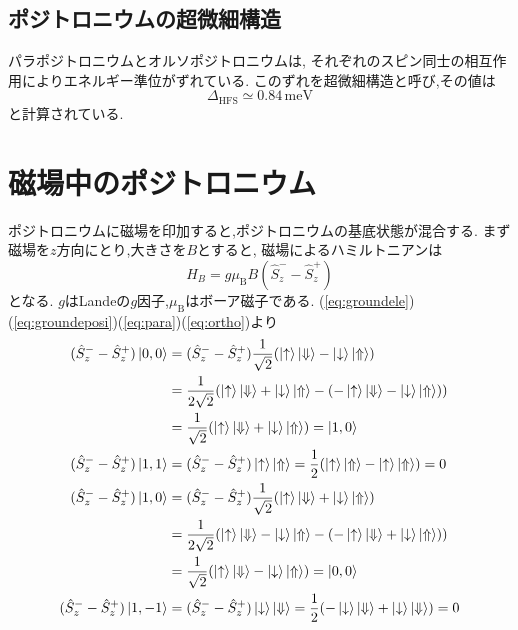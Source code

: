 \subsection{ポジトロニウムの超微細構造}

パラポジトロニウムとオルソポジトロニウムは,
それぞれのスピン同士の相互作用によりエネルギー準位がずれている.
このずれを超微細構造と呼び,その値は
\begin{equation}
	\nonumber
\Delta_{\mathrm{HFS}} \simeq 0.84 \, \mathrm{meV}
\end{equation}
と計算されている.


\section{磁場中のポジトロニウム}
ポジトロニウムに磁場を印加すると,ポジトロニウムの基底状態が混合する.
まず磁場を$z$方向にとり,大きさを$B$とすると,
磁場によるハミルトニアンは
\begin{equation}
	\nonumber
	\hat{H}_{B} = g\mu_{\mathrm{B}}B(\hat{S}^{-}_{z} - \hat{S}^{+}_{z})
\end{equation}
となる.
$g$はLandeの$g$因子,$\mu_{\mathrm{B}}$はボーア磁子である.%
(\ref{eq:groundele})(\ref{eq:groundeposi})(\ref{eq:para})(\ref{eq:ortho})より
\begin{align}
	\nonumber
(\hat{S}^{-}_{z} - \hat{S}^{+}_{z})\ket{0,0} &= (\hat{S}^{-}_{z} - \hat{S}^{+}_{z})\frac{1}{\sqrt{2}} ( \ket{ \uparrow } \ket{ \Downarrow } - \ket{ \downarrow } \ket{ \Uparrow }) \notag \\
&= \frac{1}{2\sqrt{2}} ( \ket{ \uparrow } \ket{ \Downarrow } + \ket{ \downarrow } \ket{ \Uparrow } - ( - \ket{ \uparrow } \ket{ \Downarrow } - \ket{ \downarrow } \ket{ \Uparrow } )) \notag \\
&= \frac{1}{\sqrt{2}} ( \ket{ \uparrow } \ket{ \Downarrow } + \ket{ \downarrow } \ket{ \Uparrow }) = \ket{1,0} \\
(\hat{S}^{-}_{z} - \hat{S}^{+}_{z})\ket{1,1}
&= (\hat{S}^{-}_{z} - \hat{S}^{+}_{z})\ket{ \uparrow } \ket{ \Uparrow }
=\frac{1}{2}( \ket{ \uparrow } \ket{ \Uparrow } - \ket{ \uparrow } \ket{ \Uparrow } )
= 0 \\
(\hat{S}^{-}_{z} - \hat{S}^{+}_{z})\ket{1,0} &= (\hat{S}^{-}_{z} - \hat{S}^{+}_{z})\frac{1}{\sqrt{2}} ( \ket{ \uparrow } \ket{ \Downarrow } + \ket{ \downarrow } \ket{ \Uparrow }) \notag \\
&= \frac{1}{2\sqrt{2}} ( \ket{ \uparrow } \ket{ \Downarrow } - \ket{ \downarrow } \ket{ \Uparrow } - ( - \ket{ \uparrow } \ket{ \Downarrow } + \ket{ \downarrow } \ket{ \Uparrow } )) \notag \\
&= \frac{1}{\sqrt{2}} ( \ket{ \uparrow } \ket{ \Downarrow } - \ket{ \downarrow } \ket{ \Uparrow }) = \ket{0,0} \\
(\hat{S}^{-}_{z} - \hat{S}^{+}_{z})\ket{1,-1}
&= (\hat{S}^{-}_{z} - \hat{S}^{+}_{z})\ket{ \downarrow } \ket{ \Downarrow }
=\frac{1}{2}( - \ket{ \downarrow } \ket{ \Downarrow } + \ket{ \downarrow } \ket{ \Downarrow } )
= 0
\end{align}
